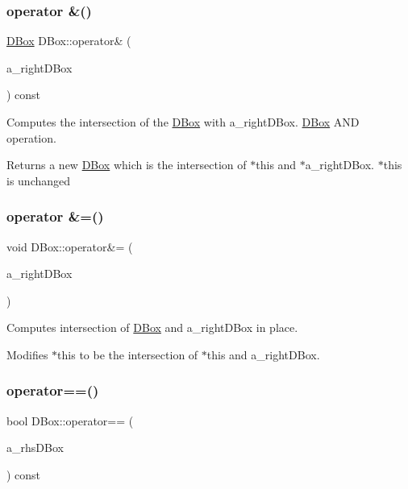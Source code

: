 \subsubsection{\texorpdfstring{operator \&()}{operator \&()}}
{\footnotesize\ttfamily \hyperlink{class_d_box}{D\+Box} D\+Box\+::operator\& (\begin{DoxyParamCaption}\item[{const \hyperlink{class_d_box}{D\+Box} \&}]{a\+\_\+right\+D\+Box }\end{DoxyParamCaption}) const}



Computes the intersection of the \hyperlink{class_d_box}{D\+Box} with a\+\_\+right\+D\+Box. \hyperlink{class_d_box}{D\+Box} A\+ND operation. 

Returns a new \hyperlink{class_d_box}{D\+Box} which is the intersection of $\ast$this and $\ast$a\+\_\+right\+D\+Box. $\ast$this is unchanged \mbox{\label{class_d_box_a98da582f742e5e82bdbb740533cc959b}} 
\subsubsection{\texorpdfstring{operator \&=()}{operator \&=()}}
{\footnotesize\ttfamily void D\+Box\+::operator\&= (\begin{DoxyParamCaption}\item[{const \hyperlink{class_d_box}{D\+Box} \&}]{a\+\_\+right\+D\+Box }\end{DoxyParamCaption})}



Computes intersection of \hyperlink{class_d_box}{D\+Box} and a\+\_\+right\+D\+Box in place. 

Modifies $\ast$this to be the intersection of $\ast$this and a\+\_\+right\+D\+Box. \mbox{\label{class_d_box_ae4b6aec5cb444f68cc8273d5629296c4}} 
\subsubsection{\texorpdfstring{operator==()}{operator==()}}
{\footnotesize\ttfamily bool D\+Box\+::operator== (\begin{DoxyParamCaption}\item[{const \hyperlink{class_d_box}{D\+Box} \&}]{a\+\_\+rhs\+D\+Box }\end{DoxyParamCaption}) const\hspace{0.3cm}{\ttfamily [inline]}}



